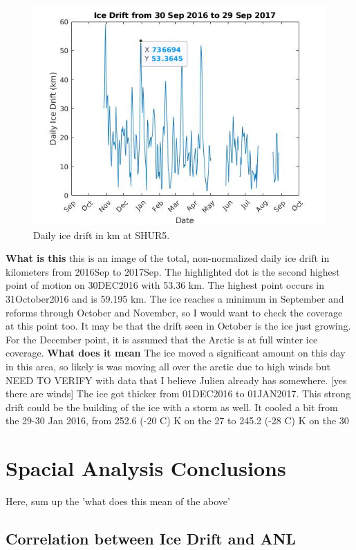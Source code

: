 \begin{figure}[h]
\centering
\includegraphics[scale=0.5]{Figures/sep2016_sep2017_drift.jpg}
\caption{Daily ice drift in km at SHUR5.}
\label{fig_totalice}
\end{figure}
\textbf{What is this}
this is an image of the total, non-normalized daily ice drift in kilometers from 2016Sep to 2017Sep. The highlighted dot is the second highest point of motion on 30DEC2016 with 53.36 km. The highest point occurs in 31October2016 and is 59.195 km. The ice reaches a minimum in September and reforms through October and November, so I would want to check the coverage at this point too. It may be that the drift seen in October is the ice just growing. For the December point, it is assumed that the Arctic is at full winter ice coverage. 
\textbf{What does it mean}
The ice moved a significant amount on this day in this area, so likely is was moving all over the arctic due to high winds but NEED TO VERIFY with data that I believe Julien already has somewhere. [yes there are winds] The ice got thicker from 01DEC2016 to 01JAN2017. This strong drift could be the building of the ice with a storm as well.
It cooled a bit from the 29-30 Jan 2016, from 252.6 (-20 C) K on the 27 to 245.2 (-28 C) K on the 30



\section{Spacial Analysis Conclusions} %

Here, sum up the 'what does this mean of the above'
%
\subsection{Correlation between Ice Drift and ANL}


